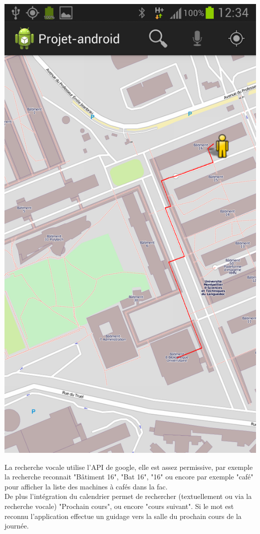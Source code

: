 \documentclass{article}
\begin{document}
	\begin{center}
   		\includegraphics[scale=0.25]{guidage.png}
	\end{center}
	
	La recherche vocale utilise l'API de google, elle est assez permissive, par exemple la recherche reconnait "Bâtiment 16", "Bat 16", "16" ou encore par exemple "café" pour afficher la liste des machines à cafés dans la fac. \\
	De plus l'intégration du calendrier permet de rechercher (textuellement ou via la recherche vocale) "Prochain cours", ou encore "cours suivant". Si le mot est reconnu l'application effectue un guidage vers la salle du prochain cours de la journée.
	
\end{document}
